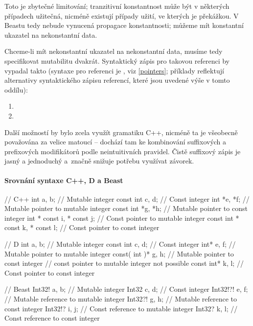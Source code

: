 Toto je zbytečné limitování; tranzitivní konstantnost může být v některých případech užitečná, nicméně existují případy užití, ve kterých je překážkou. V Beastu tedy nebude vynucená propagace konstantnosti; můžeme mít konstantní ukazatel na nekonstantní data.

Chceme-li mít nekonstantní ukazatel na nekonstantní data, musíme tedy specifikovat mutabilitu dvakrát. Syntaktický zápis pro takovou referenci by vypadal takto (syntaxe pro referenci je , viz \ref{pointers}; příklady reflektují alternativy syntaktického zápisu referencí, které jsou uvedené výše v tomto oddílu):
\begin{enumerate}
	\item {}
	\item {}
\end{enumerate}

Další možností by bylo zcela využít gramatiku C++, nicméně ta je všeobecně považována za velice matoucí -- dochází tam ke kombinování suffixových a prefixových modifikátorů podle neintuitivních pravidel. Čistě suffixový zápis je jasný a jednoduchý a~značně snižuje potřebu využívat závorek.

\paragraph{Srovnání syntaxe C++, D a Beast}
\begin{cppcode}
	// C++
	int a, b; // Mutable integer
	const int c, d; // Const integer
	int *e, *f; // Mutable pointer to mutable integer
	const int *g, *h; // Mutable pointer to const integer
	int * const i, * const j; // Const pointer to mutable integer
	const int * const k, * const l; // Const pointer to const integer
\end{cppcode}
\begin{dcode}
	// D
	int a, b; // Mutable integer
	const int c, d; // Const integer
	int* e, f; // Mutable pointer to mutable integer
	const( int )* g, h; // Mutable pointer to const integer
	// const pointer to mutable integer not possible
	const int* k, l; // Const pointer to const integer
\end{dcode}
\begin{code}
	// Beast
	Int32! a, b; // Mutable integer
	Int32 c, d; // Const integer
	Int32!?! e, f; // Mutable reference to mutable integer
	Int32?! g, h; // Mutable reference to const integer
	Int32!? i, j; // Const reference to mutable integer
	Int32? k, l; // Const reference to const integer
\end{code}

